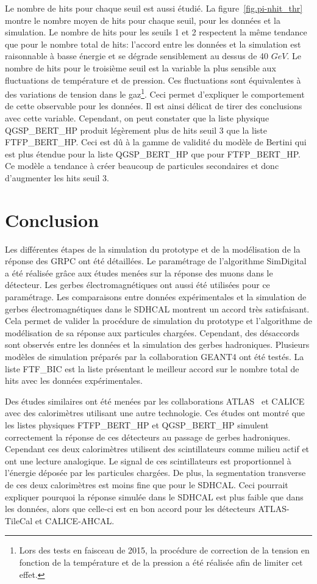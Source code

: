 Le nombre de hits pour chaque seuil est aussi étudié. La figure~\ref{fig.pi-nhit_thr} montre le nombre moyen de hits pour chaque seuil, pour les données et la simulation. Le nombre de hits pour les seuils 1 et 2 respectent la même tendance que pour le nombre total de hits: l'accord entre les données et la simulation est raisonnable à basse énergie et se dégrade sensiblement au dessus de 40 $GeV$. Le nombre de hits pour le troisième seuil est la variable la plus sensible aux fluctuations de température et de pression. Ces fluctuations sont équivalentes à des  variations de tension dans le gaz\footnote{Lors des tests en faisceau de 2015, la procédure de correction de la tension en fonction de la température et de la pression a été réalisée afin de limiter cet effet.}. Ceci permet d'expliquer le comportement de cette observable pour les données. Il est ainsi délicat de tirer des conclusions avec cette variable. Cependant, on peut constater que la liste physique QGSP\_BERT\_HP produit légèrement plus de hits seuil 3 que la liste FTFP\_BERT\_HP. Ceci est dû à la gamme de validité du modèle de Bertini qui est plus étendue pour la liste QGSP\_BERT\_HP que pour FTFP\_BERT\_HP. Ce modèle a tendance à créer beaucoup de particules secondaires et donc d'augmenter les hits seuil 3.


\section{Conclusion}
Les différentes étapes de la simulation du prototype et de la modélisation de la réponse des GRPC ont été détaillées. Le paramétrage de l'algorithme SimDigital a été réalisée grâce aux études menées sur la réponse des muons dans le détecteur. Les gerbes électromagnétiques ont aussi été utilisées pour ce paramétrage. Les comparaisons entre données expérimentales et la simulation de gerbes électromagnétiques dans le SDHCAL montrent un accord très satisfaisant. Cela permet de valider la procédure de simulation du prototype et l'algorithme de modélisation de sa réponse aux particules chargées. Cependant, des désaccords sont observés entre les données et la simulation des gerbes hadroniques. Plusieurs modèles de simulation préparés par la collaboration GEANT4 ont été testés. La liste FTF\_BIC est la liste présentant le meilleur accord sur le nombre total de hits avec les données expérimentales. 

Des études similaires ont été menées par les collaborations ATLAS~\cite{Abat} et CALICE~\cite{geant4-ahcal} avec des calorimètres utilisant une autre technologie. Ces études ont montré que les listes physiques FTFP\_BERT\_HP et QGSP\_BERT\_HP simulent correctement la réponse de ces détecteurs au passage de gerbes hadroniques. Cependant ces deux calorimètres utilisent des scintillateurs comme milieu actif et ont une lecture analogique. Le signal de ces scintillateurs est proportionnel à l'énergie déposée par les particules chargées. De plus, la segmentation transverse de ces deux calorimètres est moins fine que pour le SDHCAL. Ceci pourrait expliquer pourquoi la réponse simulée dans le SDHCAL est plus faible que dans les données, alors que celle-ci est en bon accord pour les détecteurs ATLAS-TileCal et CALICE-AHCAL.
